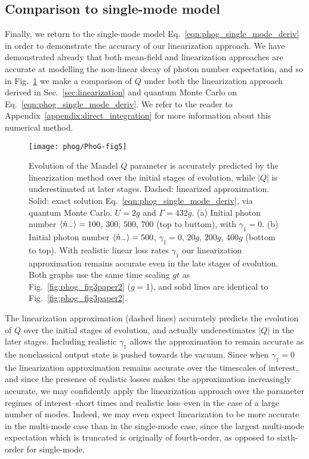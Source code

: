 \subsection{Comparison to single-mode model}
Finally, we return to the single-mode model Eq.~\ref{eqn:phog_single_mode_deriv} in order to demonstrate the accuracy of our linearization approach. We have demonstrated already that both mean-field and linearization approaches are accurate at modelling the non-linear decay of photon number expectation, and so in Fig.~\ref{fig:phog_single_mode_linearization} we make a comparison of $Q$ under both the linearization approach derived in Sec.~\ref{sec:linearization} and quantum Monte Carlo on Eq.~\ref{eqn:phog_single_mode_deriv}. We refer to the reader to Appendix~\ref{appendix:direct_integration} for more information about this numerical method.

\begin{figure}[htp]
\captionsetup{width=0.8\linewidth}
\centering
\texttt{[image: phog/PhoG-fig5]}
\caption{\label{fig:phog_single_mode_linearization} Evolution of the Mandel $Q$ parameter is accurately predicted by the linearization method over the initial stages of evolution, while $\left|Q\right|$ is underestimated at later stages. Dashed: linearized approximation. Solid: exact solution Eq.~\ref{eqn:phog_single_mode_deriv}, via quantum Monte Carlo. $U = 2g$ and $\Gamma = 432g$. (a) Initial photon number $\ev{\hat{n}_-} = 100$, $300$, $500$, $700$ (top to buttom), with $\gamma_1 = 0$. (b) Initial photon number $\ev{\hat{n}_-}=500$, $\gamma_1 = 0$, $20g$, $200g$, $400g$ (bottom to top). With realistic linear loss rates $\gamma_1$ our linearization approximation remains accurate even in the late stages of evolution. Both graphs use the same time scaling $g t$ as Fig.~\ref{fig:phog_fig3paper2} ($g=1$), and solid lines are identical to Fig.~\ref{fig:phog_fig3paper2}.}
\end{figure}

The linearization approximation (dashed lines) accurately predicts the evolution of $Q$ over the initial stages of evolution, and actually underestimates $\left|Q\right|$ in the later stages. Including realistic $\gamma_1$ allows the approximation to remain accurate as the nonclassical output state is pushed towards the vacuum. Since when $\gamma_1 = 0$ the linearization approximation remains accurate over the timescales of interest, and since the presence of realistic losses makes the approximation increasingly accurate, we may confidently apply the linearization approach over the parameter regimes of interest--short times and realistic loss--even in the case of a large number of modes. Indeed, we may even expect linearization to be more accurate in the multi-mode case than in the single-mode case, since the largest multi-mode expectation which is truncated is originally of fourth-order, as opposed to sixth-order for single-mode.

